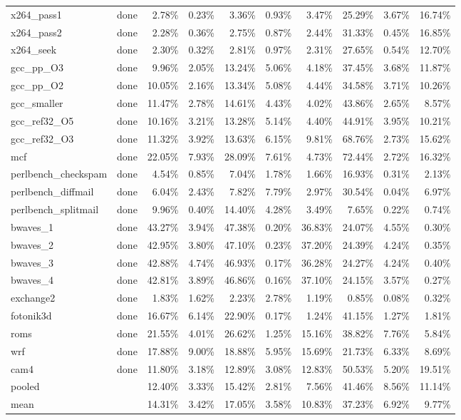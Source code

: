 \documentclass[10pt,a4paper,landscape]{article}
\begin{document}
{\begin{longtable}{llrrrrrrrr}
x264\_pass1 & done & 2.78\% & 0.23\% & 3.36\% & 0.93\% & 3.47\% & 25.29\% & 3.67\% & 16.74\% \\
x264\_pass2 & done & 2.28\% & 0.36\% & 2.75\% & 0.87\% & 2.44\% & 31.33\% & 0.45\% & 16.85\% \\
x264\_seek & done & 2.30\% & 0.32\% & 2.81\% & 0.97\% & 2.31\% & 27.65\% & 0.54\% & 12.70\% \\
gcc\_pp\_O3 & done & 9.96\% & 2.05\% & 13.24\% & 5.06\% & 4.18\% & 37.45\% & 3.68\% & 11.87\% \\
gcc\_pp\_O2 & done & 10.05\% & 2.16\% & 13.34\% & 5.08\% & 4.44\% & 34.58\% & 3.71\% & 10.26\% \\
gcc\_smaller & done & 11.47\% & 2.78\% & 14.61\% & 4.43\% & 4.02\% & 43.86\% & 2.65\% & 8.57\% \\
gcc\_ref32\_O5 & done & 10.16\% & 3.21\% & 13.28\% & 5.14\% & 4.40\% & 44.91\% & 3.95\% & 10.21\% \\
gcc\_ref32\_O3 & done & 11.32\% & 3.92\% & 13.63\% & 6.15\% & 9.81\% & 68.76\% & 2.73\% & 15.62\% \\
mcf & done & 22.05\% & 7.93\% & 28.09\% & 7.61\% & 4.73\% & 72.44\% & 2.72\% & 16.32\% \\
perlbench\_checkspam & done & 4.54\% & 0.85\% & 7.04\% & 1.78\% & 1.66\% & 16.93\% & 0.31\% & 2.13\% \\
perlbench\_diffmail & done & 6.04\% & 2.43\% & 7.82\% & 7.79\% & 2.97\% & 30.54\% & 0.04\% & 6.97\% \\
perlbench\_splitmail & done & 9.96\% & 0.40\% & 14.40\% & 4.28\% & 3.49\% & 7.65\% & 0.22\% & 0.74\% \\
bwaves\_1 & done & 43.27\% & 3.94\% & 47.38\% & 0.20\% & 36.83\% & 24.07\% & 4.55\% & 0.30\% \\
bwaves\_2 & done & 42.95\% & 3.80\% & 47.10\% & 0.23\% & 37.20\% & 24.39\% & 4.24\% & 0.35\% \\
bwaves\_3 & done & 42.88\% & 4.74\% & 46.93\% & 0.17\% & 36.28\% & 24.27\% & 4.24\% & 0.40\% \\
bwaves\_4 & done & 42.81\% & 3.89\% & 46.86\% & 0.16\% & 37.10\% & 24.15\% & 3.57\% & 0.27\% \\
exchange2 & done & 1.83\% & 1.62\% & 2.23\% & 2.78\% & 1.19\% & 0.85\% & 0.08\% & 0.32\% \\
fotonik3d & done & 16.67\% & 6.14\% & 22.90\% & 0.17\% & 1.24\% & 41.15\% & 1.27\% & 1.81\% \\
roms & done & 21.55\% & 4.01\% & 26.62\% & 1.25\% & 15.16\% & 38.82\% & 7.76\% & 5.84\% \\
wrf & done & 17.88\% & 9.00\% & 18.88\% & 5.95\% & 15.69\% & 21.73\% & 6.33\% & 8.69\% \\
cam4 & done & 11.80\% & 3.18\% & 12.89\% & 3.08\% & 12.83\% & 50.53\% & 5.20\% & 19.51\% \\
\midrule
pooled &  & 12.40\% & 3.33\% & 15.42\% & 2.81\% & 7.56\% & 41.46\% & 8.56\% & 11.14\% \\
mean &  & 14.31\% & 3.42\% & 17.05\% & 3.58\% & 10.83\% & 37.23\% & 6.92\% & 9.77\% \\
\end{longtable}
}
\clearpage
\end{document}
